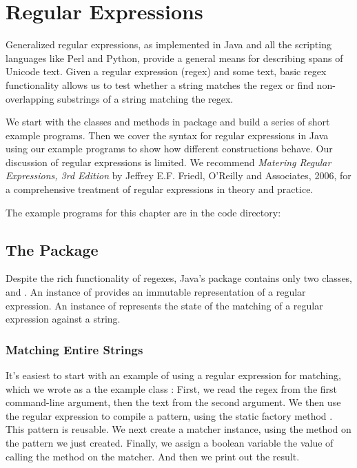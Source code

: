 \chapter{Regular Expressions}\label{chapter:regex}

Generalized regular expressions, as implemented in Java and all the
scripting languages like Perl and Python, provide a general means for
describing spans of Unicode text.  Given a regular expression (regex)
and some text, basic regex functionality allows us to test whether a
string matches the regex or find non-overlapping substrings of a
string matching the regex.

We start with the classes and methods in package 
and build a series of short example programs.
Then we cover the syntax for regular expressions in Java using
our example programs to show how different constructions behave.
Our discussion of regular expressions is limited.
We recommend 
\emph{Matering Regular Expressions, 3rd Edition} by Jeffrey E.F. Friedl,
O'Reilly and Associates, 2006, for a comprehensive treatment of
regular expressions in theory and practice.

The example programs for this chapter are in the code directory:
%


\section{The  Package}\label{section:java-util-regex}

Despite the rich functionality of regexes, Java's
 package contains only two classes,
 and .  An instance of 
provides an immutable representation of a regular expression. An
instance of  represents the state of the matching of a
regular expression against a string.

\subsection{Matching Entire Strings}\label{section:exact-match-regex}

It's easiest to start with an example of using a regular expression
for matching, which we wrote as a the example class :
%
%
%
First, we read the regex from the first command-line argument, then
the text from the second argument.  We then use the regular expression
to compile a pattern, using the static factory method
.  This pattern is reusable.  We next
create a matcher instance, using the method  on the
pattern we just created.  Finally, we assign a boolean variable
 the value of calling the method  
on the matcher.  And then we print out the result.

